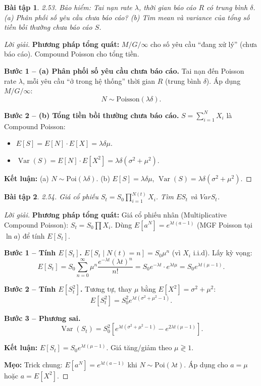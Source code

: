 \documentclass[8pt,a4paper]{article}
\newtheorem{exercise}{Bài tập}
\newenvironment{solution}{\begin{proof}[Lời giải]}{\end{proof}}
\newcommand{\Var}{\operatorname{Var}}
\begin{document}
\begin{exercise}
2.53. Bảo hiểm: Tai nạn rate $\lambda$, thời gian báo cáo $R$ có trung bình $\delta$.
(a) Phân phối số yêu cầu chưa báo cáo? (b) Tìm mean và variance của tổng số tiền bồi thường chưa báo cáo $S$.
\end{exercise}
\begin{solution}
\textbf{Phương pháp tổng quát:} $M/G/\infty$ cho số yêu cầu ``đang xử lý'' (chưa báo cáo). Compound Poisson cho tổng tiền.

\textbf{Bước 1 -- (a) Phân phối số yêu cầu chưa báo cáo.} Tai nạn đến Poisson rate $\lambda$, mỗi yêu cầu ``ở trong hệ thống'' thời gian $R$ (trung bình $\delta$). Áp dụng $M/G/\infty$:
\[
  \boxed{N \sim \text{Poisson}(\lambda\delta)}.
\]

\textbf{Bước 2 -- (b) Tổng tiền bồi thường chưa báo cáo.} $S = \sum_{i=1}^{N} X_i$ là Compound Poisson:
\begin{itemize}[nosep]
  \item $E[S] = E[N] \cdot E[X] = \boxed{\lambda\delta\mu}$.
  \item $\Var(S) = E[N] \cdot E[X^2] = \boxed{\lambda\delta(\sigma^2 + \mu^2)}$.
\end{itemize}

\textbf{Kết luận:} (a) $N \sim \text{Poi}(\lambda\delta)$. (b) $E[S] = \lambda\delta\mu$, $\Var(S) = \lambda\delta(\sigma^2+\mu^2)$.
\end{solution}

\begin{exercise}
2.54. Giá cổ phiếu $S_t = S_0 \prod_{i=1}^{N(t)} X_i$. Tìm $E S_t$ và $Var S_t$.
\end{exercise}
\begin{solution}
\textbf{Phương pháp tổng quát:} Giá cổ phiếu nhân (Multiplicative Compound Poisson): $S_t = S_0 \prod X_i$. Dùng $E[a^N] = e^{\lambda t(a-1)}$ (MGF Poisson tại $\ln a$) để tính $E[S_t]$.

\textbf{Bước 1 -- Tính $E[S_t]$.} $E[S_t \mid N(t) = n] = S_0 \mu^n$ (vì $X_i$ i.i.d). Lấy kỳ vọng:
\[
  E[S_t] = S_0 \sum_{n=0}^\infty \mu^n \frac{e^{-\lambda t}(\lambda t)^n}{n!} = S_0 e^{-\lambda t} \cdot e^{\lambda t \mu} = \boxed{S_0 e^{\lambda t(\mu-1)}}.
\]

\textbf{Bước 2 -- Tính $E[S_t^2]$.} Tương tự, thay $\mu$ bằng $E[X^2] = \sigma^2 + \mu^2$:
\[
  E[S_t^2] = S_0^2 e^{\lambda t(\sigma^2 + \mu^2 - 1)}.
\]

\textbf{Bước 3 -- Phương sai.}
\[
  \boxed{\Var(S_t) = S_0^2 \left[e^{\lambda t(\sigma^2+\mu^2-1)} - e^{2\lambda t(\mu-1)}\right]}.
\]

\textbf{Kết luận:} $E[S_t] = S_0 e^{\lambda t(\mu-1)}$. Giá tăng/giảm theo $\mu \gtrless 1$.

\textbf{Mẹo:} Trick chung: $E[a^N] = e^{\lambda t(a-1)}$ khi $N \sim \text{Poi}(\lambda t)$. Áp dụng cho $a = \mu$ hoặc $a = E[X^2]$.
\end{solution}
\end{document}

